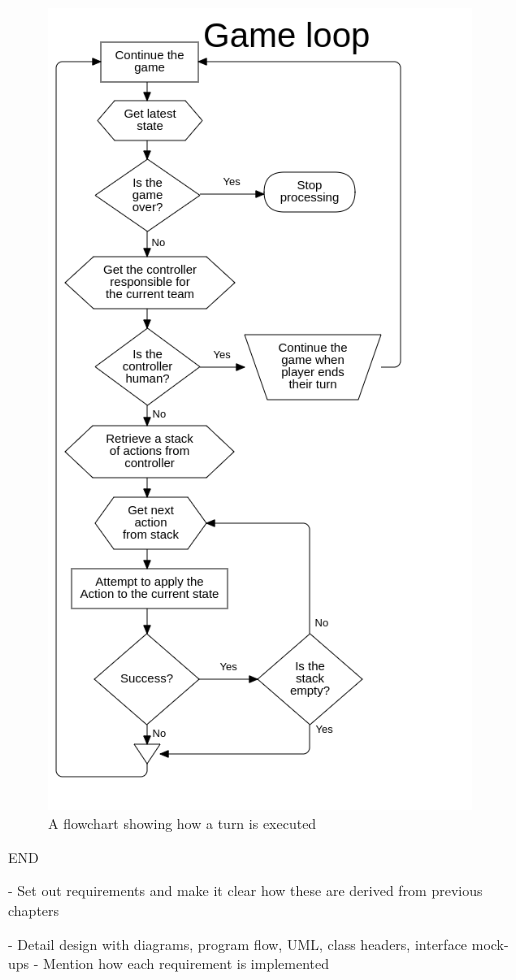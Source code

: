 \documentclass[11pt, a4paper]{article}
\begin{document}
\begin{figure}[!h]
  \centering
  \includegraphics[width=12cm]{img/game_loop.png}
  \caption{A flowchart showing how a turn is executed}
  \label{fig:gameLoop}
\end{figure}

END

- Set out requirements and make it clear how these are derived from previous chapters

- Detail design with diagrams, program flow, UML, class headers, interface mock-ups
  - Mention how each requirement is implemented
\end{document}
